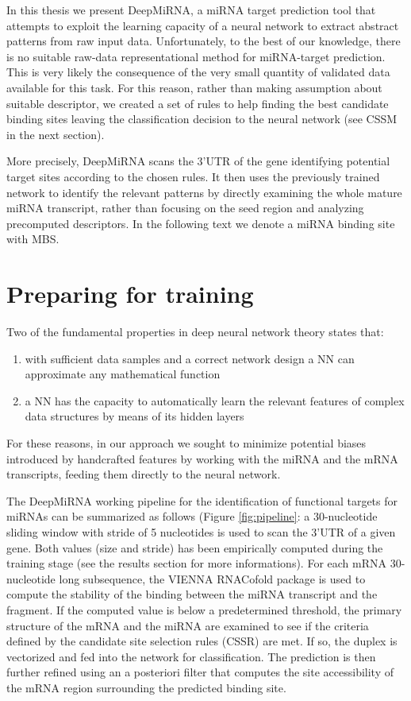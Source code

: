 In this thesis we present DeepMiRNA, a miRNA target prediction tool that attempts to exploit the learning capacity of a neural network to extract abstract patterns from raw input data. Unfortunately, to the best of our knowledge, there is no suitable raw-data representational method for miRNA-target prediction. This is very likely the consequence of the very small quantity of validated data available for this task. For this reason, rather than making assumption about suitable descriptor, we created a set of rules to help finding the best candidate binding sites leaving the classification decision to the neural network (see CSSM in the next section). 

More precisely, DeepMiRNA scans the 3'UTR of the gene identifying potential target sites according to the chosen rules. It then uses the previously trained network to identify the relevant patterns by directly examining the whole mature miRNA transcript, rather than focusing on the seed region and analyzing precomputed descriptors. In the following text we denote a miRNA binding site with MBS.

\section{Preparing for training}
Two of the fundamental properties in deep neural network theory states that:

\begin{enumerate}
	\item with sufficient data samples and a correct network design a NN can approximate any mathematical function
	\item a NN has the capacity to automatically learn the relevant features of complex data structures by means of its hidden layers \cite{dl}
\end{enumerate}

For these reasons, in our approach we sought to minimize potential biases introduced by handcrafted features by working  with the miRNA and the mRNA transcripts, feeding them directly to the neural network.

The DeepMiRNA working pipeline for the identification of functional targets for miRNAs can be summarized as follows (Figure \ref{fig:pipeline}: a 30-nucleotide sliding window with stride of 5 nucleotides is used to scan the 3'UTR of a given gene. Both values (size and stride) has been empirically computed during the training stage (see the results section for more informations). For each mRNA 30-nucleotide long subsequence, the VIENNA RNACofold package \cite{vienna_rna} is used to compute the stability of the binding between the miRNA transcript and the fragment. If the computed value is below a predetermined threshold, the primary structure of the mRNA and the miRNA are examined to see if the criteria defined by the candidate site selection rules (CSSR) are met. If so, the duplex is vectorized and fed into the network for classification. The prediction is then further refined using an a posteriori filter that computes the site accessibility of the mRNA region surrounding the predicted binding site. 

